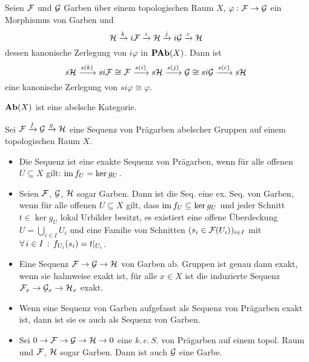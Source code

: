 \documentclass{cheat-sheet}
\newcommand{\keS}{k.\,e.\,S.} %
\begin{document}
\begin{prop}
  Seien $\mathcal{F}$ und $\mathcal{G}$ Garben über einem topologischen Raum $X$, $\varphi : \mathcal{F} \to \mathcal{G}$ ein Morphismus von Garben und
  \[ \mathcal{H} \xrightarrow{k} i \mathcal{F} \xrightarrow{i} \mathcal{H} \xrightarrow{j} i \mathcal{G} \xrightarrow{c} \mathcal{H} \ \]
  dessen kanonische Zerlegung von $i \varphi$ in $\mathbf{PAb}(X)$. Dann ist
  \[ s \mathcal{H} \xrightarrow{s(k)} si \mathcal{F} \cong \mathcal{F} \xrightarrow{s(i)} s \mathcal{H} \xrightarrow{s(j)} \mathcal{G} \cong si \mathcal{G} \xrightarrow{s(c)} s \mathcal{H} \ \]
  eine kanonische Zerlegung von $si \varphi \cong \varphi$.
\end{prop}

\begin{kor}
  $\mathbf{Ab}(X)$ ist eine abelsche Kategorie.
\end{kor}

\begin{bem}
  Sei $\mathcal{F} \xrightarrow{f} \mathcal{G} \xrightarrow{g} \mathcal{H}$ eine Sequenz von Prägarben abelscher Gruppen auf einem topologischen Raum $X$.
  \begin{itemize}
    \item Die Sequenz ist eine exakte Sequenz von Prägarben, wenn für alle offenen $U \subseteq X$ gilt: $\operatorname{im} f_U = \ker g_U$.
    \item Seien $\mathcal{F}$, $\mathcal{G}$, $\mathcal{H}$ sogar Garben. Dann ist die Seq. eine ex. Seq. von Garben, wenn für alle offenen $U \subseteq X$ gilt, dass $\operatorname{im} f_U \subseteq \ker g_U$ und jeder Schnitt $t \in \ker g_U$ lokal Urbilder besitzt, \dh{} es existiert eine offene Überdeckung $U = {\bigcup}_{i \in I} U_i$ und eine Familie von Schnitten $(s_i \in \mathcal{F}(U_i))_{i \in I}$ mit
    $\forall \, {i \in I} \,:\, f_{U_i}(s_i) = t|_{U_i}$.
  \end{itemize}
\end{bem}

\begin{lem}
  \begin{itemize}
    \item Eine Sequenz $\mathcal{F} \to \mathcal{G} \to \mathcal{H}$ von Garben ab. Gruppen ist genau dann exakt, wenn sie halmweise exakt ist, \dh{} für alle $x \in X$ ist die induzierte Sequenz $\mathcal{F}_x \to \mathcal{G}_x \to \mathcal{H}_x$ exakt.
    \item Wenn eine Sequenz von Garben aufgefasst als Sequenz von Prägarben exakt ist, dann ist sie es auch als Sequenz von Garben.
    \item Sei $0 \to \mathcal{F} \to \mathcal{G} \to \mathcal{H} \to 0$ eine $\keS{}$ von Prägarben auf einem topol. Raum und $\mathcal{F}$, $\mathcal{H}$ sogar Garben. Dann ist auch $\mathcal{G}$ eine Garbe.
  \end{itemize}
\end{lem}
\end{document}
